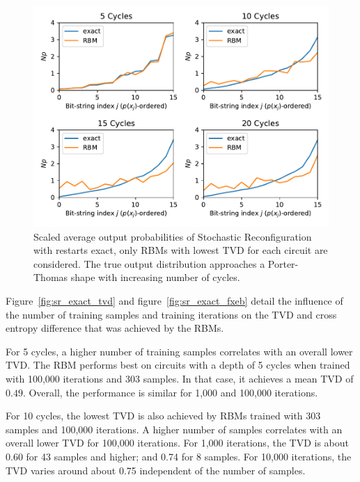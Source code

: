 \begin{figure}[H]
  \centering
  \includegraphics[width=\textwidth]{figures/results/SR-restarts-not-learned/avgBestPDF.pdf}
  \caption[Scaled Average Output Probabilities of Best Performing RBMs Trained with Stochastic Reconfiguration with Random Restarts and $CZ$ Gates Applied Exactly]{
    Scaled average output probabilities of Stochastic Reconfiguration with restarts exact, only RBMs with lowest
    TVD for each circuit are considered. The true 
    output distribution approaches a Porter-Thomas shape with increasing number of cycles.}
  \label{fig:sr_exact_bestPDF}
\end{figure}

Figure~\ref{fig:sr_exact_tvd} and figure~\ref{fig:sr_exact_fxeb} detail the influence of the 
number of training samples and training iterations on the TVD and cross entropy difference that was achieved by 
the RBMs. 

For 5 cycles, a higher number of training samples 
correlates with an overall lower TVD. The RBM performs best on 
circuits with a depth of 5 cycles when trained with 100,000 iterations and 303 samples. In that case, 
it achieves a mean TVD of $0.49$. Overall, the performance is similar for 1,000 and 100,000 iterations.

For 10 cycles, the lowest TVD is also achieved by RBMs trained with 303 samples and 100,000 iterations.
A higher number of samples correlates with an overall lower TVD for 100,000 iterations. For 1,000 iterations, 
the TVD is about 0.60 for 43 samples and higher; and 0.74 for 8 samples. For 10,000 iterations, the TVD varies 
around about 0.75 independent of the number of samples. 

